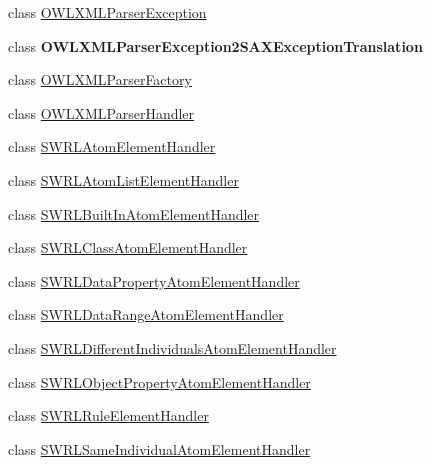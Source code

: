 \begin{DoxyCompactItemize}
\item 
class \hyperlink{classorg_1_1coode_1_1owlapi_1_1owlxmlparser_1_1_o_w_l_x_m_l_parser_exception}{O\-W\-L\-X\-M\-L\-Parser\-Exception}
\item 
class {\bfseries O\-W\-L\-X\-M\-L\-Parser\-Exception2\-S\-A\-X\-Exception\-Translation}
\item 
class \hyperlink{classorg_1_1coode_1_1owlapi_1_1owlxmlparser_1_1_o_w_l_x_m_l_parser_factory}{O\-W\-L\-X\-M\-L\-Parser\-Factory}
\item 
class \hyperlink{classorg_1_1coode_1_1owlapi_1_1owlxmlparser_1_1_o_w_l_x_m_l_parser_handler}{O\-W\-L\-X\-M\-L\-Parser\-Handler}
\item 
class \hyperlink{classorg_1_1coode_1_1owlapi_1_1owlxmlparser_1_1_s_w_r_l_atom_element_handler}{S\-W\-R\-L\-Atom\-Element\-Handler}
\item 
class \hyperlink{classorg_1_1coode_1_1owlapi_1_1owlxmlparser_1_1_s_w_r_l_atom_list_element_handler}{S\-W\-R\-L\-Atom\-List\-Element\-Handler}
\item 
class \hyperlink{classorg_1_1coode_1_1owlapi_1_1owlxmlparser_1_1_s_w_r_l_built_in_atom_element_handler}{S\-W\-R\-L\-Built\-In\-Atom\-Element\-Handler}
\item 
class \hyperlink{classorg_1_1coode_1_1owlapi_1_1owlxmlparser_1_1_s_w_r_l_class_atom_element_handler}{S\-W\-R\-L\-Class\-Atom\-Element\-Handler}
\item 
class \hyperlink{classorg_1_1coode_1_1owlapi_1_1owlxmlparser_1_1_s_w_r_l_data_property_atom_element_handler}{S\-W\-R\-L\-Data\-Property\-Atom\-Element\-Handler}
\item 
class \hyperlink{classorg_1_1coode_1_1owlapi_1_1owlxmlparser_1_1_s_w_r_l_data_range_atom_element_handler}{S\-W\-R\-L\-Data\-Range\-Atom\-Element\-Handler}
\item 
class \hyperlink{classorg_1_1coode_1_1owlapi_1_1owlxmlparser_1_1_s_w_r_l_different_individuals_atom_element_handler}{S\-W\-R\-L\-Different\-Individuals\-Atom\-Element\-Handler}
\item 
class \hyperlink{classorg_1_1coode_1_1owlapi_1_1owlxmlparser_1_1_s_w_r_l_object_property_atom_element_handler}{S\-W\-R\-L\-Object\-Property\-Atom\-Element\-Handler}
\item 
class \hyperlink{classorg_1_1coode_1_1owlapi_1_1owlxmlparser_1_1_s_w_r_l_rule_element_handler}{S\-W\-R\-L\-Rule\-Element\-Handler}
\item 
class \hyperlink{classorg_1_1coode_1_1owlapi_1_1owlxmlparser_1_1_s_w_r_l_same_individual_atom_element_handler}{S\-W\-R\-L\-Same\-Individual\-Atom\-Element\-Handler}

\end{DoxyCompactItemize}

